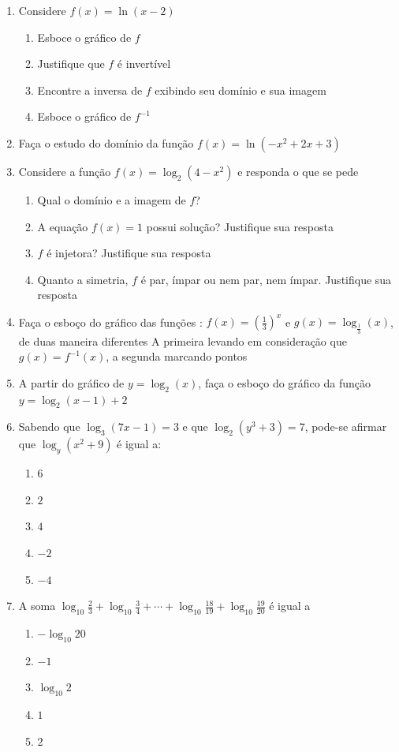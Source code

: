 \begin{enumerate}
\item Considere $f(x)=\ln(x-2)$

\begin{enumerate}
	\item Esboce o gráfico de $f$
	\item Justifique que $f$ é invertível
	\item Encontre a inversa de $f$ exibindo seu domínio e sua imagem
	\item Esboce o gráfico de $f^{-1}$
\end{enumerate}

    \item Faça o estudo do domínio da função $f(x)= \ln(-x^2+2x+3)$
   \item Considere a função $f(x)=\log_2(4-x^2)$ e responda o que se pede
    \begin{enumerate}
        \item Qual o domínio e a imagem de $f$?
        \item A equação $f(x)=1$ possui solução? Justifique sua resposta
        \item $f$ é injetora? Justifique sua resposta
        \item Quanto a simetria, $f$ é par, ímpar ou nem par, nem ímpar. Justifique sua resposta
        \end{enumerate}
    \item  Faça o esboço do gráfico das funções : $f(x)= \left( \frac{1}{3} \right)^x$ e $g(x)=\log_{\frac{1}{3}}(x)$,  de duas maneira diferentes A primeira levando em consideração que $g(x)=f^{-1}(x)$, a segunda marcando pontos

     \item A partir do gráfico de $y=\log_2(x)$, faça o esboço do gráfico da função $y=\log_2(x-1)+2$
	\item Sabendo que $\log_3(7x-1) = 3$ e que $\log_2(y^3 + 3) = 7$, pode-se afirmar que $\log_y(x^2 + 9)$ é igual a:
	\begin{enumerate}
		\item $6$
		\item $2$
		\item $4$
		\item $-2$
		\item $-4$
	\end{enumerate}

	\item A soma $\log_{10}\frac23+\log_{10}\frac34+\cdots+\log_{10}\frac{18}{19}+\log_{10}\frac{19}{20}$
	é igual a
	\begin{enumerate}
		\item $-\log_{10}20$
		\item $-1$
		\item $\log_{10}2$
		\item $1$
		\item $2$
	\end{enumerate}


\end{enumerate}
